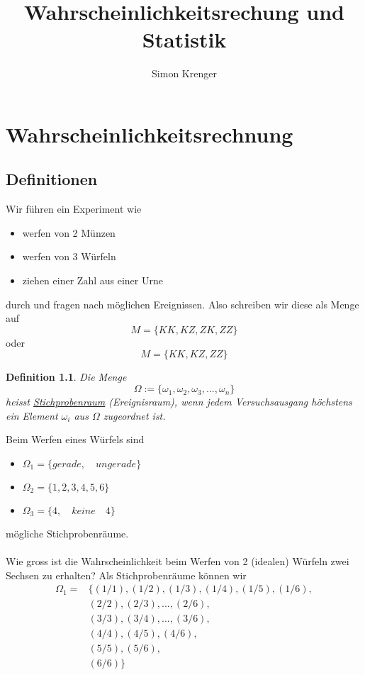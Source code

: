 \documentclass{report}
\title{Wahrscheinlichkeitsrechung und Statistik}
\author{Simon Krenger}
\newtheorem{mydef}{Definition}
\begin{document}
\maketitle
\chapter{Wahrscheinlichkeitsrechnung}
\section{Definitionen}
Wir führen ein Experiment wie
\begin{itemize}
\item werfen von 2 Münzen
\item werfen von 3 Würfeln
\item ziehen einer Zahl aus einer Urne
\end{itemize}
durch und fragen nach möglichen Ereignissen. Also schreiben wir diese als Menge auf
\begin{equation}
M = \{ KK, KZ, ZK, ZZ \}
\end{equation}
oder
\begin{equation}
M = \{ KK, KZ, ZZ \}
\end{equation}
\begin{mydef}
Die Menge
\begin{equation}
\Omega := \{ \omega_1, \omega_2, \omega_3, ..., \omega_n \}
\end{equation}
heisst \underline{Stichprobenraum} (Ereignisraum), wenn jedem Versuchsausgang höchstens ein Element $\omega_i$ aus $\Omega$ zugeordnet ist.
\end{mydef}
Beim Werfen eines Würfels sind
\begin{itemize}
\item $\Omega_1 = \{ gerade, \quad ungerade \}$
\item $\Omega_2 = \{ 1,2,3,4,5,6 \}$
\item $\Omega_3 = \{ 4, \quad keine \quad 4 \}$
\end{itemize}
mögliche Stichprobenräume.\\\\
Wie gross ist die Wahrscheinlichkeit beim Werfen von 2 (idealen) Würfeln zwei Sechsen zu erhalten?
Als Stichprobenräume können wir
\begin{align*}
 \Omega_1 =& \{ (1/1), (1/2), (1/3), (1/4), (1/5), (1/6), \\
 \quad & (2/2), (2/3), ..., (2/6), \\
 \quad & (3/3), (3/4), ..., (3/6), \\
 \quad & (4/4), (4/5), (4/6), \\
 \quad & (5/5), (5/6), \\
 \quad & (6/6) \}
\end{align*}
\end{document}

